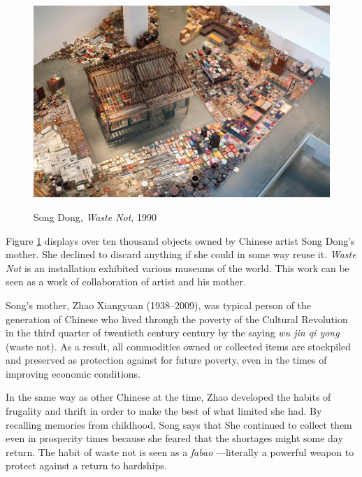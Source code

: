 \begin{figure}[h!]
  \centering
  \includegraphics[height=8cm]{graphics/SongDong_WasteNot.jpg}
  \caption{Song Dong, \textit{Waste Not}, 1990}
  \label{fig:SongDong_WasteNot}
\end{figure}

Figure \ref{fig:SongDong_WasteNot} displays over ten thousand objects owned by Chinese artist Song Dong’s mother. She declined to discard anything if she could in some way reuse it. \textit{Waste Not} is an installation exhibited various museums of the world. This work can be seen as a work of collaboration of artist and his mother.

Song’s mother, Zhao Xiangyuan (1938–2009), was typical person of the generation of Chinese who lived through the poverty of the Cultural Revolution in the third quarter of twentieth century century by the saying \textit{wu jin qi yong} (waste not). As a result, all commodities owned or collected items are stockpiled and preserved as protection against for future poverty, even in the times of improving economic conditions.

In the same way as other Chinese at the time, Zhao developed the habits of frugality and thrift in order to make the best of what limited she had. By recalling memories from childhood, Song says that  She continued to collect them even in prosperity times because she feared that the shortages might some day return. The habit of waste not is seen as a \textit{fabao} ---literally a powerful weapon to protect against a return to hardships.

